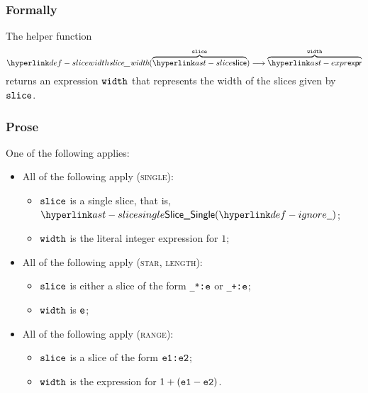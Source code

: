 \subsubsection{Formally}
\begin{mathpar}
\end{mathpar}

\begin{mathpar}
\end{mathpar}

\hypertarget{def-slicewidth}{}
The helper function
\[
  \slicewidth(\overname{\slice}{\vslice}) \aslto
  \overname{\expr}{\vwidth}
\]
returns an expression $\vwidth$ that represents the width of the slices given by $\vslice$.

\subsubsection{Prose}
One of the following applies:
\begin{itemize}
  \item All of the following apply (\textsc{single}):
  \begin{itemize}
    \item $\vslice$ is a single slice, that is, $\SliceSingle(\Ignore)$;
    \item $\vwidth$ is the literal integer expression for $1$;
  \end{itemize}

  \item All of the following apply (\textsc{star, length}):
  \begin{itemize}
    \item $\vslice$ is either a slice of the form \texttt{\_*:$\ve$} or \texttt{\_+:$\ve$};
    \item $\vwidth$ is $\ve$;
  \end{itemize}

  \item All of the following apply (\textsc{range}):
  \begin{itemize}
    \item $\vslice$ is a slice of the form \texttt{$\veone$:$\vetwo$};
    \item $\vwidth$ is the expression for $1 + (\veone - \vetwo)$.
  \end{itemize}
\end{itemize}
